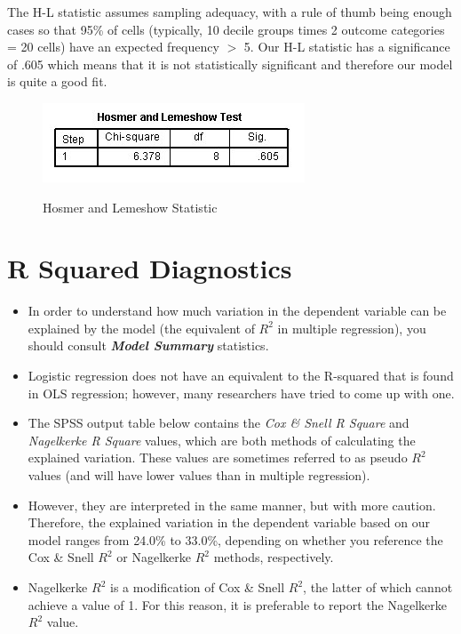 \documentclass[a4paper,12pt]{article}
\begin{document}
The H-L statistic assumes sampling adequacy, with a rule of thumb being enough cases so that 95\% of cells (typically, 10 decile groups times 2 outcome categories = 20 cells) have an expected frequency $>$ 5. Our H-L statistic has a significance of .605 which means that it is not statistically significant and therefore our model is quite a
good fit.
\begin{figure}[h!]
	\begin{center}
		\includegraphics[scale=0.6]{images/Logistic7A}\\
		\caption{Hosmer and Lemeshow Statistic}
	\end{center}
\end{figure}

\section{R Squared Diagnostics}
\begin{itemize}
	\item In order to understand how much variation in the dependent variable can be explained by the model (the equivalent of $R^2$ in multiple regression), you should consult \textbf{\textit{Model Summary}} statistics.
	
	\item 
	Logistic regression does not have an equivalent to the R-squared that is found in OLS regression; however, many researchers have tried to come up with one. 
	
	
	\item The SPSS output table below contains the \textit{Cox \& Snell R Square} and \textit{Nagelkerke R Square }values, which are both methods of calculating the explained variation. These values are sometimes referred to as pseudo $R^2$ values (and will have lower values than in multiple regression).
	\item  However, they are interpreted in the same manner, but with more caution. Therefore, the explained variation in the dependent variable based on our model ranges from 24.0\% to 33.0\%, depending on whether you reference the Cox \& Snell $R^2$ or Nagelkerke $R^2$ methods, respectively. 
	
	\item Nagelkerke $R^2$ is a modification of Cox \& Snell $R^2$, the latter of which cannot achieve a value of 1. For this reason, it is preferable to report the Nagelkerke $R^2$ value.
\end{itemize}
\end{document}
